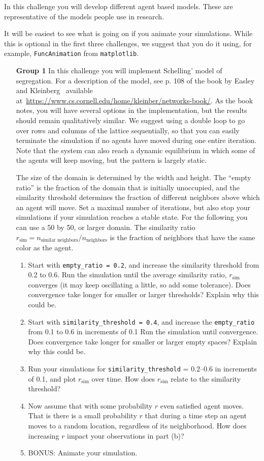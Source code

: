 \documentclass[12pt]{article}
\begin{document}
In this challenge you will develop different agent based models.  These are representative of the
models people use in research.

It will be easiest to see what is going on if you animate  your simulations. While this is optional
in the first three challenges, we suggest that you do it using, for example, \verb|FuncAnimation| from \verb|matplotlib|.

\begin{enumerate}
\item[\bf Group 1]  In this challenge you will implement Schelling' model  of segregation.   
For a description of the model, see p. 108 of the book by Easley and Kleinberg~\cite{easley10} available at~\url{https://www.cs.cornell.edu/home/kleinber/networks-book/}.  As
the book notes, you will have several options in the implementation, but the results should
remain qualitatively similar.  We suggest using a double loop to go over rows and columns of the lattice sequentially, 
so that you can easily terminate the simulation if no agents have moved during one entire iteration.
Note that the system can also reach a dynamic equilibrium in which some of the agents will
keep moving, but the pattern is largely static.

The size of the domain is determined by the width and height. The ``empty ratio'' is the fraction of 
the domain that is initially unoccupied, and the similarity threshold determines the fraction of different neighbors above which 
an agent will move.  Set a maximal number of iterations, but also stop your simulations if your simulation
reaches a stable state. For the following you can use a 50 by 50, or larger domain.  The 
similarity ratio $r_{\text{sim}} = n_{\text{similar neighbors}}/n_{\text{neighbors}}$ is the fraction
of neighbors that have the same color as the agent.

\begin{enumerate}
\item  Start with \verb|empty_ratio = 0.2|, and increase the similarity threshold from 0.2 to 0.6.   
Run the simulation until the average similarity ratio, $r_{\text{sim}}$ converges (it may keep oscillating a little, so
add some tolerance).
Does convergence take longer for smaller or larger thresholds?  Explain why this could be.
\item  Start with \verb|similarity_threshold = 0.4|, and increase the \verb|empty_ratio| from 0.1 to 0.6 in increments of 0.1   
Run the simulation until convergence.  
Does convergence take longer for smaller or larger empty spaces?  Explain why this could be.
\item Run your simulations for  \verb|similarity_threshold| = 0.2--0.6 in increments of 0.1, and plot $r_{\text{sim}}$ over time.
How does  $r_{\text{sim}}$ relate to the similarity threshold?
\item Now assume that with some probability $r$ even satisfied agent moves.
That is there is a small probability $r$ that during a time step an agent moves to a random location, 
regardless of its neighborhood.  How does increasing $r$ impact your observations in part (b)?  
\item BONUS: Animate your simulation.
\end{enumerate}


\end{enumerate}
\end{document}
